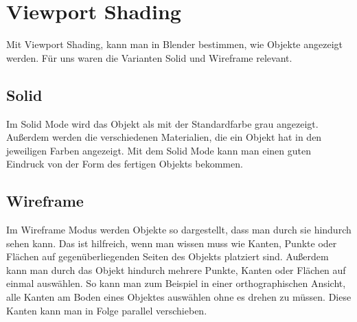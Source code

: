 \section{Viewport Shading}
Mit Viewport Shading, kann man in Blender bestimmen, wie Objekte angezeigt werden. Für uns waren die Varianten Solid und Wireframe relevant.

\subsection{Solid}
Im Solid Mode wird das Objekt als mit der Standardfarbe grau angezeigt. Außerdem werden die verschiedenen Materialien, die ein Objekt
hat in den jeweiligen Farben angezeigt. Mit dem Solid Mode kann man einen guten Eindruck von der Form des fertigen Objekts bekommen.

\subsection{Wireframe}
Im Wireframe Modus werden Objekte so dargestellt, dass man durch sie hindurch sehen kann.
Das ist hilfreich, wenn man wissen muss wie Kanten, Punkte oder Flächen auf gegenüberliegenden Seiten des Objekts
platziert sind. Außerdem kann man durch das Objekt hindurch mehrere Punkte, Kanten oder Flächen auf einmal auswählen. So kann man zum Beispiel
in einer orthographischen Ansicht, alle Kanten am Boden eines Objektes auswählen ohne es drehen zu müssen. Diese Kanten kann
man in Folge parallel verschieben.
